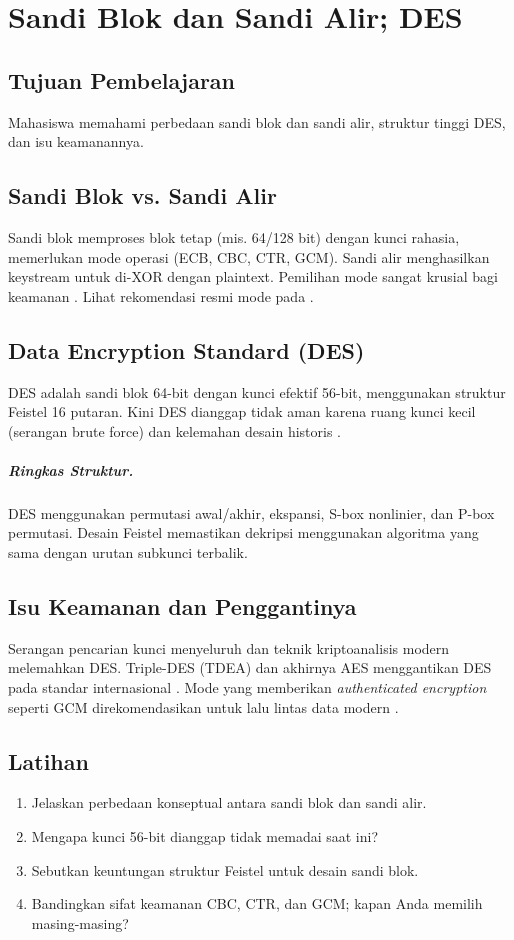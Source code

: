 \documentclass[../main.tex]{subfiles}
\begin{document}
\chapter{Sandi Blok dan Sandi Alir; DES}

\section{Tujuan Pembelajaran}
Mahasiswa memahami perbedaan sandi blok dan sandi alir, struktur tinggi DES, dan isu keamanannya.

\section{Sandi Blok vs. Sandi Alir}
Sandi blok memproses blok tetap (mis. 64/128 bit) dengan kunci rahasia, memerlukan mode operasi (ECB, CBC, CTR, GCM). Sandi alir menghasilkan keystream untuk di-XOR dengan plaintext. Pemilihan mode sangat krusial bagi keamanan \citep{stallings,menezes}. Lihat rekomendasi resmi mode pada \citep{nist_sp_800_38a,nist_sp_800_38d}.

\section{Data Encryption Standard (DES)}
DES adalah sandi blok 64-bit dengan kunci efektif 56-bit, menggunakan struktur Feistel 16 putaran. Kini DES dianggap tidak aman karena ruang kunci kecil (serangan brute force) dan kelemahan desain historis \citep{nist_des,stallings}.

\paragraph{Ringkas Struktur.} DES menggunakan permutasi awal/akhir, ekspansi, S-box nonlinier, dan P-box permutasi. Desain Feistel memastikan dekripsi menggunakan algoritma yang sama dengan urutan subkunci terbalik.

\section{Isu Keamanan dan Penggantinya}
Serangan pencarian kunci menyeluruh dan teknik kriptoanalisis modern melemahkan DES. Triple-DES (TDEA) dan akhirnya AES menggantikan DES pada standar internasional \citep{nist_des,nist_sp_800_67r2,nist_aes}. Mode yang memberikan \emph{authenticated encryption} seperti GCM direkomendasikan untuk lalu lintas data modern \citep{nist_sp_800_38d}.

\section{Latihan}
\begin{enumerate}
  \item Jelaskan perbedaan konseptual antara sandi blok dan sandi alir.
  \item Mengapa kunci 56-bit dianggap tidak memadai saat ini?
  \item Sebutkan keuntungan struktur Feistel untuk desain sandi blok.
  \item Bandingkan sifat keamanan CBC, CTR, dan GCM; kapan Anda memilih masing-masing?
\end{enumerate}
\end{document}
